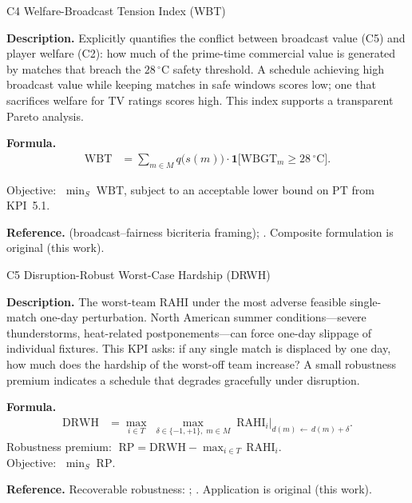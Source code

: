 \documentclass[12pt, letterpaper]{article}
\newcommand{\kpilabel}[1]{\noindent\textbf{#1}\enspace}
\begin{document}
\begin{kpibox}{C4 \textendash{} Welfare-Broadcast Tension Index (WBT)}

\kpilabel{Description.}
Explicitly quantifies the conflict between broadcast value (C5) and
player welfare (C2): how much of the prime-time commercial value is
generated by matches that breach the $28\,^\circ$C safety threshold.
A schedule achieving high broadcast value while keeping matches in safe
windows scores low; one that sacrifices welfare for TV ratings scores
high.  This index supports a transparent Pareto analysis.

\medskip
\kpilabel{Formula.}
\begin{align*}
  \mathrm{WBT} &= \sum_{m \in M}
    q\!\bigl(s(m)\bigr)\cdot
    \mathbf{1}\!\bigl[\mathrm{WBGT}_m \geq 28\,^\circ\text{C}\bigr].
\end{align*}
\vspace{-8pt}

\noindent
Objective: $\;\displaystyle\min_{S}\;\mathrm{WBT}$,
subject to an acceptable lower bound on $\mathrm{PT}$ from KPI~5.1.

\medskip
\kpilabel{Reference.}
\citet{RibeiroUrrutia2007} (broadcast--fairness bicriteria framing);
\citet{FIFPRO2025}.  Composite formulation is original (this work).
\end{kpibox}

\begin{kpibox}{C5 \textendash{} Disruption-Robust Worst-Case Hardship (DRWH)}

\kpilabel{Description.}
The worst-team RAHI under the most adverse feasible single-match one-day
perturbation.  North American summer conditions---severe thunderstorms,
heat-related postponements---can force one-day slippage of individual
fixtures.  This KPI asks: if any single match is displaced by one day,
how much does the hardship of the worst-off team increase?  A small
robustness premium indicates a schedule that degrades gracefully under
disruption.

\medskip
\kpilabel{Formula.}
\begin{align*}
  \mathrm{DRWH} &= \max_{i \in T}\;
    \max_{\delta \in \{-1,+1\},\;m \in M}\;
    \mathrm{RAHI}_i\!\big|_{d(m)\,\leftarrow\,d(m)+\delta}.
\end{align*}
Robustness premium:
$\;\mathrm{RP} = \mathrm{DRWH} - \max_{i \in T}\,\mathrm{RAHI}_i$.
\\[4pt]
Objective: $\;\displaystyle\min_{S}\;\mathrm{RP}$.

\medskip
\kpilabel{Reference.}
Recoverable robustness: \citet{Liebchen2009};
\citet{KendallEtAl2010}.  Application is original (this work).
\end{kpibox}
\end{document}
